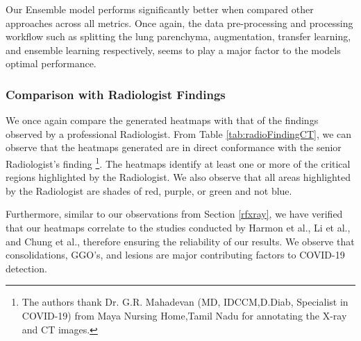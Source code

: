 Our Ensemble model performs significantly better when compared other approaches across all metrics. Once again, the data pre-processing and processing workflow such as splitting the lung parenchyma, augmentation, transfer learning, and ensemble learning respectively, seems to play a major factor to the models optimal performance.


\subsubsection{Comparison with Radiologist Findings}

We once again compare the generated heatmaps with that of the findings observed by a professional Radiologist. From Table \ref{tab:radioFindingCT}, we can observe that the heatmaps generated are in direct conformance with the senior Radiologist's finding \footnote{The authors thank Dr. G.R. Mahadevan (MD, IDCCM,D.Diab, Specialist in COVID-19) from Maya Nursing Home,Tamil Nadu for annotating the X-ray and CT images.}. The heatmaps identify at least one or more of the critical regions highlighted by the Radiologist. We also observe that all areas highlighted by the Radiologist are shades of red, purple, or green and not blue. 

Furthermore, similar to our observations from Section \ref{rfxray}, we have verified that our heatmaps correlate to the studies conducted by Harmon et al., Li et al., and Chung et al., therefore ensuring the reliability of our results. We observe that consolidations, GGO's, and lesions are major contributing factors to COVID-19 detection.

